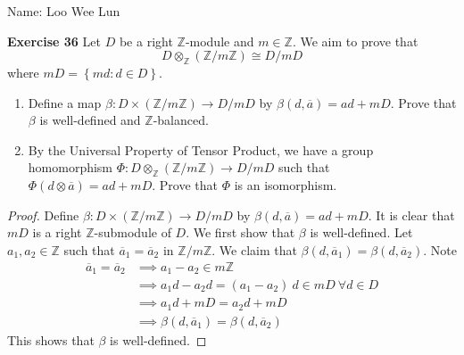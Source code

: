 \documentclass{article}
\theoremstyle{definition}
\newcommand{\Z}{{\mathbb Z}}
\newcommand{\ten}{\otimes_\Z}
\newcommand{\tens}{\otimes}
\renewcommand{\a}{\overline{a}}
\newcommand{\sbr}[1]{\left\{#1\right\}}
\begin{document}
Name: Loo Wee Lun

\medskip

\textbf{Exercise 36} Let $D$ be a right $\Z$-module and $m\in \Z$. We aim to prove that
    \[D\ten (\Z/m\Z) \cong D/mD\]
    where $mD = \sbr{md:d\in D}$.
    \begin{enumerate}
        \item Define a map $\beta: D\times (\Z/m\Z)\to D/mD$ by $\beta(d,\a) = ad + mD$. Prove that $\beta$ is well-defined and $\Z$-balanced.
        \item By the Universal Property of Tensor Product, we have a group homomorphism $\Phi: D\ten (\Z/m\Z)\to D/mD$ such that $\Phi(d\tens \a) = ad + mD$. Prove that $\Phi$ is an isomorphism.
    \end{enumerate}
\begin{proof}
    \hfill

    Define $\beta: D\times (\Z/m\Z) \to D/mD$ by $\beta(d,\a) = ad + mD$. It is clear that $mD$ is a right $\Z$-submodule of $D$. We first show that $\beta$ is well-defined. Let $a_1, a_2\in \Z$ such that $\a_1 = \a_2$ in $\Z/m\Z$. We claim that $\beta(d, \a_1) = \beta(d,\a_2)$. Note 
    \begin{align*}
        \a_1 = \a_2 
    &\implies a_1 -a_2 \in m\Z  \\
    &\implies a_1 d - a_2 d = (a_1-a_2)\ d \in mD\ \forall d\in D\\
    &\implies a_1d + mD = a_2 d + mD\\
    &\implies \beta(d, \a_1) = \beta(d,\a_2)
    \end{align*}
    This shows that $\beta$ is well-defined.


\end{proof}
\end{document}
